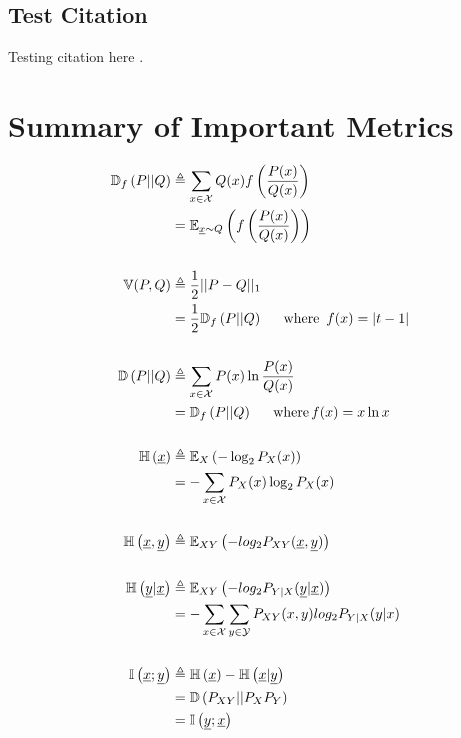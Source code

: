 \documentclass[11pt]{article}
\begin{document}
\subsection{Test Citation}
Testing citation here \cite{key}.

\newpage
\appendix

\section{Summary of Important Metrics}
\begin{equation*}
    \begin{aligned}
        \mathbb{D}_f \left( P \middle|\middle| Q\right) &\triangleq \sum_{x\in\mathcal{X}} Q(x)f\left(\frac{P(x)}{Q(x)}\right)\\
        &= \mathbb{E}_{\underline{x}\sim Q} \left( f\left(\frac{P(x)}{Q(x)}\right) \right)\\ 
        \\
        \mathbb{V}(P,Q) &\triangleq \frac{1}{2} ||P-Q||_1 \\
        &= \frac{1}{2}\mathbb{D}_f \left( P \middle|\middle| Q\right) \hspace{1.5em} \mathrm{where} \,\ f(x) = |t-1|\\
        \\
        \mathbb{D} \left( P \middle|\middle| Q\right) &\triangleq \sum_{x\in\mathcal{X}}P(x)\ln\frac{P(x)}{Q(x)} \\
        &= \mathbb{D}_f \left( P \middle|\middle| Q\right) \hspace{1.5em} \mathrm{where} \, f(x) = x \ln x \\
        \\
        \mathbb{H} \left( \underline{x} \right) &\triangleq \mathbb{E}_{X} \left( -\log_2 P_X(x) \right) \\
        &= -\sum_{x\in\mathcal{X}} P_X(x) \log_2 P_X(x) \\
        \\
        \mathbb{H} \left( \underline{x}, \underline{y} \right) &\triangleq \mathbb{E}_{XY} \left( -log_2 P_{XY}(\underline{x}, \underline{y}) \right) \\ 
        \\
        \mathbb{H} \left( \underline{y} | \underline{x} \right) &\triangleq \mathbb{E}_{XY} \left( -log_2 P_{Y|X}(\underline{y} | \underline{x}) \right) \\
        &= - \sum_{x\in\mathcal{X}}\sum_{y\in\mathcal{Y}}P_{XY}(x,y)log_2 P_{Y|X}(y|x)\\
        \\
        \mathbb{I}\left(\underline{x};\underline{y}\right) &\triangleq \mathbb{H} \left( \underline{x} \right) - \mathbb{H} \left( \underline{x}|\underline{y} \right) \\
        &= \mathbb{D} \left( P_{XY} \middle|\middle| P_X P_Y\right) \\
        &= \mathbb{I}\left(\underline{y};\underline{x}\right)\\
    \end{aligned}
\end{equation*}

\newpage
\printbibliography
\end{document}
